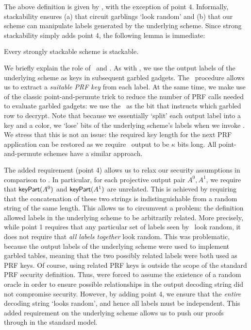 The above definition is given by \HK, with the exception of point 4.
Informally, stackability ensures (a) that circuit garblings `look
random' and (b) that our scheme can manipulate labels generated by the
underlying scheme.
Since strong stackability simply adds point 4, the following lemma is
immediate:
\begin{lemma}\label{lemma:stack-strongstack}
  Every strongly stackable scheme is stackable.
\end{lemma}

We briefly explain the role of \lcolor\ and \lkey. As with \HK, we
use the output labels of the underlying scheme as keys in subsequent
garbled gadgets.  The \lkey\ procedure allows us to extract a
\emph{suitable PRF key} from each label. At the same time, we make use
of the classic point-and-permute trick to reduce the number of PRF calls
needed to evaluate garbled gadgets: we use the \lcolor\ as the bit
that instructs which garbled row to decrypt.  Note that because we
essentially `split’ each output label into a key and a color, we
`lose’ bits of the underlying scheme’s labels when we invoke
\lkey. We stress that this is not an issue: the required key
length for the next PRF application can be restored as we require
\lkey\ output to be $\kappa$ bits long. All point-and-permute schemes
have a similar approach.

The added requirement (point 4) allows us to relax
our security assumptions in comparison to \HK. In particular, for
each projective output pair $A^0, A^1$, we require that $\textsf{keyPart}(A^0)$ and
$\textsf{keyPart}(A^1)$ are unrelated.
This is achieved by requiring that the concatenation of these two
strings is indistinguishable from a random string of the same length.
This allows us to circumvent a problem: the \HK definition allowed labels in the underlying
scheme to be arbitrarily related.
More precisely, while point 1 requires that any particular set of labels seen by
\E\ look random, it does not require that \emph{all labels together}
look random.
%
This was problematic, because the output labels of the
underlying scheme were used to implement garbled tables, meaning that
the two possibly related labels were both used as PRF keys.
%
Of course, using related PRF keys is outside the scope of the standard
PRF security definition.
%
Thus, \HK were forced to assume the existence of a random oracle in
order to ensure possible relationships in the output decoding string
did not compromise security.
%
However, by adding point 4, we ensure that the \emph{entire} decoding
string `looks random', and hence all labels must be independent.
This added requirement on the underlying scheme allows us to push our
proofs through in the standard model.


